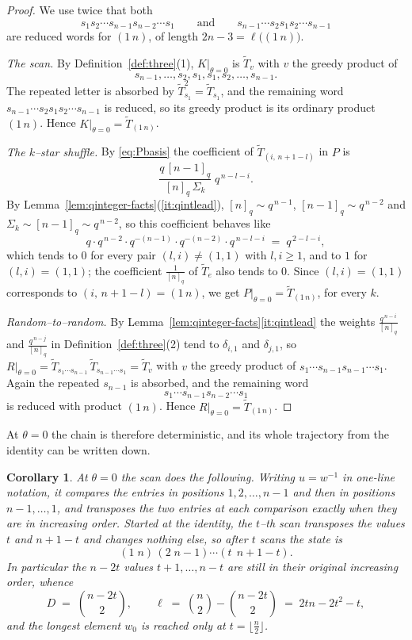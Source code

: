 \documentclass[11pt]{article}
\theoremstyle{plain}  %
\newtheorem{corollary}[theorem]{Corollary}
\begin{document}
\begin{proof}
We use twice that both
$$
  s_1 s_2\cdots s_{n-1}s_{n-2}\cdots s_1
  \qquad\text{and}\qquad
  s_{n-1}\cdots s_2 s_1 s_2\cdots s_{n-1}
$$
are reduced words for $(1\,n)$, of length $2n-3 = \ell\bigl((1\,n)\bigr)$.

\emph{The scan.} By Definition~\ref{def:three}(1), $K|_{\theta=0}$ is
$\widetilde T_{v}$ with $v$ the greedy product of
$$s_{n-1},\dots,s_2,s_1,s_1,s_2,\dots,s_{n-1}.$$ The repeated letter is absorbed by
$\widetilde T_{s_1}^{2} = \widetilde T_{s_1}$, and the remaining word
$s_{n-1}\cdots s_2s_1s_2\cdots s_{n-1}$ is reduced, so its greedy product is its ordinary
product $(1\,n)$. Hence $K|_{\theta=0} = \widetilde T_{(1\,n)}$.

\emph{The $k$--star shuffle.} By \eqref{eq:Pbasis} the coefficient of
$\widetilde T_{(i,\,n+1-l)}$ in $P$ is
$$
  \frac{q\,[n-1]_q}{[n]_q\,\Sigma_k}\;q^{\,n-l-i} .
$$
By Lemma~\ref{lem:qinteger-facts}(\ref{it:qintlead}), $[n]_q \sim q^{\,n-1}$, $[n-1]_q \sim q^{\,n-2}$ and
$\Sigma_k \sim [n-1]_q \sim q^{\,n-2}$, so this coefficient behaves like
$$
  q \cdot q^{\,n-2} \cdot q^{-(n-1)} \cdot q^{-(n-2)} \cdot q^{\,n-l-i}
  \;=\; q^{\,2-l-i},
$$
which tends to $0$ for every pair $(l,i) \neq (1,1)$ with $l,i \ge 1$, and to $1$ for
$(l,i) = (1,1)$; the coefficient $\frac{1}{[n]_q}$ of $\widetilde T_{e}$ also tends to $0$. Since
$(l,i) = (1,1)$ corresponds to $(i,\,n+1-l) = (1\,n)$, we get
$P|_{\theta=0} = \widetilde T_{(1\,n)}$, for every $k$.

\emph{Random--to--random.} By Lemma~\ref{lem:qinteger-facts}\ref{it:qintlead} the weights $\frac{q^{\,n-i}}{[n]_q}$ and
$\frac{q^{\,n-j}}{[n]_q}$ in Definition~\ref{def:three}(2) tend to $\delta_{i,1}$ and
$\delta_{j,1}$, so
$R|_{\theta=0} = \widetilde T_{s_1\cdots s_{n-1}}\,\widetilde T_{s_{n-1}\cdots s_1}
= \widetilde T_{v}$ with $v$ the greedy product of
$s_1\cdots s_{n-1}s_{n-1}\cdots s_1$. Again the repeated $s_{n-1}$ is absorbed, and the
remaining word $$s_1\cdots s_{n-1}s_{n-2}\cdots s_1$$ is reduced with product $(1\,n)$. Hence
$R|_{\theta=0} = \widetilde T_{(1\,n)}$.
\end{proof}

At $\theta = 0$ the chain is therefore deterministic, and its whole trajectory from the
identity can be written down.

\begin{corollary}\label{cor:theta0orbit}
At $\theta = 0$ the scan does the following. Writing $u = w^{-1}$ in one-line notation, it
compares the entries in positions $1,2,\dots,n-1$ and then in positions $n-1,\dots,1$, and
transposes the two entries at each comparison exactly when they are in increasing order.
Started at the identity, the $t$--th scan transposes the values $t$ and $n+1-t$ and changes
nothing else, so after $t$ scans the state is
$$
  (1\;n)\,(2\;n-1)\cdots(t\;\,n+1-t) .
$$
In particular the $n-2t$ values $t+1, \dots, n-t$ are still in their original increasing
order, whence
$$
  D \;=\; \binom{n-2t}{2},
  \qquad
  \ell \;=\; \binom n2 - \binom{n-2t}{2} \;=\; 2tn-2t^{2}-t ,
$$
and the longest element $w_0$ is reached only at $t = \lfloor \frac{n}{2} \rfloor$.
\end{corollary}
\end{document}
